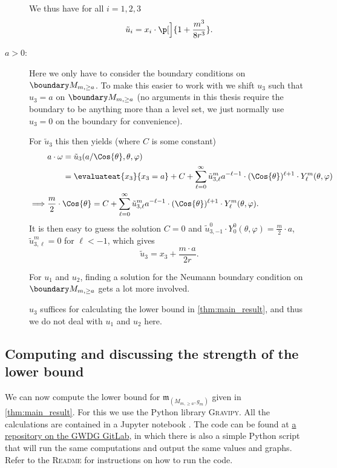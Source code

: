 \documentclass[titlepage,numbers=noenddot,oneside,%
cleardoublepage=empty,paper=a4,fontsize=11pt,%
english,%
]{scrartcl}
\newcommand{\mass}[2]{\mathfrak{m}_{(#1,#2)}} %
\begin{document}
\begin{description}
    We thus have for all \( i=1,2,3 \)
    \begin{equation*}
        \tilde{u}_i=x_i\cdot \p[\Big]{1+\frac{m^3}{8r^3}}.
    \end{equation*}
    \item[\( a>0 \):] Here we only have to consider the boundary conditions on \( \modifiedschwarzschildboundary \). To make this easier to work with we shift \( u_3 \) such that \( u_3=a \) on \( \modifiedschwarzschildboundary \) (no arguments in this thesis require the boundary to be anything more than a level set, we just normally use \( u_3=0 \) on the boundary for convenience).
    
    For \( \tilde{u}_3 \) this then yields (where \( C \) is some constant)
    \begin{align*}
        &\begin{aligned}[t]
            a\cdot \omega&=\tilde{u}_3(a/\Cos{\theta},\theta,\varphi)\\
            &=\evaluateat{x_3}{x_3=a}+C+\sum_{\ell=0}^{\infty}\tilde{u}_{3,\ell}^m a^{-\ell-1}\cdot (\Cos{\theta})^{\ell+1}\cdot Y^m_{\ell}(\theta,\varphi)
        \end{aligned}\\
        \implies &\frac{m}{2}\cdot \Cos{\theta}=C+\sum_{\ell=0}^{\infty}\tilde{u}_{3,\ell}^m a^{-\ell-1}\cdot (\Cos{\theta})^{\ell+1}\cdot Y^m_{\ell}(\theta,\varphi).
    \end{align*}
    It is then easy to guess the solution \( C=0 \) and \( \tilde{u}_{3,-1}^0\cdot Y_0^0(\theta,\varphi)=\frac{m}{2}\cdot a \), \( \tilde{u}_{3,\ell}^m=0 \) for \( \ell< -1 \), which gives
    \begin{equation*}
        \tilde{u}_3=x_3+\frac{m\cdot a}{2 r}.
    \end{equation*}

    For \( u_1 \) and \( u_2 \), finding a solution for the Neumann boundary condition on \( \modifiedschwarzschildboundary \) gets a lot more involved.

     \( u_3 \) suffices for calculating the lower bound in \cref{thm:main_result}, and thus we do not deal with \( u_1 \) and \( u_2 \) here. %
\end{description}
\subsection{Computing and discussing the strength of the lower bound}
We can now compute the lower bound for \( \mass{M_{m,\geq a}}{g_m} \) given in \cref{thm:main_result}. For this we use the Python library \textsc{Gravipy}. All the calculations are contained in a Jupyter notebook \cite{fischerhenryrubenHarmonicFunctionMethod2023}. The code can be found at \href{https://gitlab.gwdg.de/henryruben.fischer/bachelor-thesis-harmonic-functions-and-mass-of-asymptotically-flat-half-spaces/-/blob/master/computations_and_graphs/computations_and_graphs.ipynb}{a repository on the GWDG GitLab}, in which there is also a simple Python script that will run the same computations and output the same values and graphs. Refer to the \textsc{Readme} for instructions on how to run the code.
\end{document}
